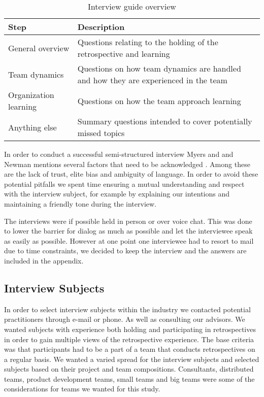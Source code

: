 \begin{table}
	\begin{centering}
	\caption{Interview guide overview}
	\label{table:interview-guide-overview}
	\begin{tabular}{l p{}}
	 	Step & Description \\ 
		\hline
		General overview & Questions relating to the holding of the retrospective and learning\\
		Team dynamics & Questions on how team dynamics are handled and how they are experienced in the team \\
		Organization learning & Questions on how the team approach learning \\
		Anything else & Summary questions intended to cover potentially missed topics \\
	\end{tabular}
	\end{centering}
\end{table}

In order to conduct a successful semi-structured interview Myers and and Newman mentions several factors that need to be acknowledged \cite{Myers2007}. Among these are the lack of trust, elite bias and ambiguity of language. In order to avoid these potential pitfalls we spent time ensuring a mutual understanding and respect with the interview subject, for example by explaining our intentions and maintaining a friendly tone during the interview. 

The interviews were if possible held in person or over voice chat. This was done to lower the barrier for dialog as much as possible and let the interviewee speak as easily as possible. However at one point one interviewee had to resort to mail due to time constraints, we decided to keep the interview and the answers are included in the appendix. 

\subsection{Interview Subjects}
\label{subsec:Interview-Subjects}
In order to select interview subjects within the industry we contacted potential practitioners through e-mail or phone. As well as consulting our advisors. We wanted subjects with experience both holding and participating in retrospectives in order to gain multiple views of the retrospective experience. The base criteria was that participants had to be a part of a team that conducts retrospectives on a regular basis. We wanted a varied spread for the interview subjects and selected subjects based on their project and team compositions. Consultants, distributed teams, product development teams, small teams and big teams were some of the considerations for teams we wanted for this study.

